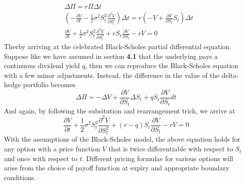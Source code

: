 \documentclass{article}
\begin{document}
\begin{align*}
    & \Delta \Pi = r\Pi\Delta t \\
    & \left( -\frac{\partial V}{\partial t}-\frac{1}{2}\sigma^2 S_t^2\frac{\partial^2 V}{\partial S_t^2}\right)\Delta t = r\left( -V + \frac{\partial V}{\partial S_t}S_t \right) \Delta t \\
    & \frac{\partial V}{\partial t} + \frac{1}{2}\sigma^2 S_t^2\frac{\partial^2 V}{\partial S_t^2} + rS_t  \frac{\partial V}{\partial S_t} -rV = 0
\end{align*}
Therby arriving at the celebrated Black-Scholes partial differential equation. Suppose like we have assumed in section \textbf{4.1} that the underlying pays a continuous dividend yield $q$, then we can reproduce the Black-Scholes equation with a few minor adjustments. Instead, the difference in the value of the delta-hedge portfolio becomes 
$$\Delta\Pi = -\Delta V + \frac{\partial V}{\partial S_t}\Delta S_t + q S_t\frac{\partial V}{\partial S_t}dt $$
And again, by following the subsitution and rearrangement trick, we arrive at 
$$\frac{\partial V}{\partial t} + \frac{1}{2}\sigma^2 S_t^2\frac{\partial^2 V}{\partial S_t^2} + (r-q)S_t  \frac{\partial V}{\partial S_t} -rV = 0$$
With the assumptions of the Black-Scholes model, the above equation holds for any option with a price function $V$ that is twice differentiable with respect to $S_t$ and once with respect to $t$. Different pricing formulae for various options will arise from the choice of payoff function at expiry and appropriate boundary conditions.
\end{document}
